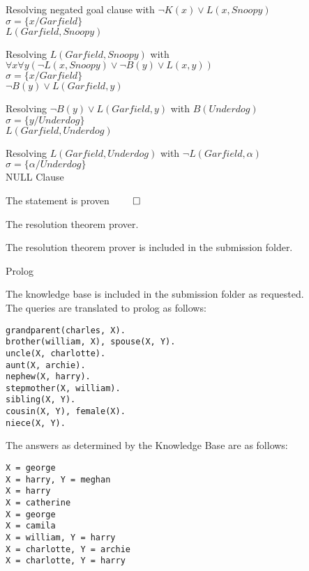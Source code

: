 \documentclass[12pt]{article}
\begin{document}
\noindent
Resolving negated goal clause with $\lnot K(x)\lor L(x,Snoopy)$\\
$\sigma=\{x/Garfield\}$\\
$L(Garfield, Snoopy)$

\noindent
Resolving $L(Garfield, Snoopy)$ with $\forall x\forall y(\lnot L(x, Snoopy)\lor \lnot B(y)\lor L(x,y))$\\
$\sigma=\{x/Garfield\}$\\
$\lnot B(y)\lor L(Garfield,y)$

\noindent
Resolving $\lnot B(y)\lor L(Garfield,y)$ with $B(Underdog)$\\
$\sigma=\{y/Underdog\}$\\
$L(Garfield,Underdog)$

\noindent
Resolving $L(Garfield,Underdog)$ with $\lnot L(Garfield,\alpha)$\\
$\sigma=\{\alpha/Underdog\}$\\
NULL Clause

\noindent
The statement is proven $\qed$

\newpage
\problem The resolution theorem prover.

\solution The resolution theorem prover is included in the submission folder.

\problem Prolog

\solution
The knowledge base is included in the submission folder as requested.\\
The queries are translated to prolog as follows:
\begin{verbatim}
grandparent(charles, X).
brother(william, X), spouse(X, Y).
uncle(X, charlotte).
aunt(X, archie).
nephew(X, harry).
stepmother(X, william).
sibling(X, Y).
cousin(X, Y), female(X).
niece(X, Y).
\end{verbatim}

\noindent
The answers as determined by the Knowledge Base are as follows:
\begin{verbatim}
X = george
X = harry, Y = meghan
X = harry
X = catherine
X = george
X = camila
X = william, Y = harry
X = charlotte, Y = archie
X = charlotte, Y = harry
\end{verbatim}
\end{document}
